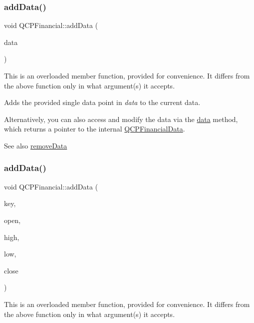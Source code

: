 \subsubsection{\texorpdfstring{add\+Data()}{addData()}\hspace{0.1cm}{\footnotesize\ttfamily [2/4]}}
{\footnotesize\ttfamily void Q\+C\+P\+Financial\+::add\+Data (\begin{DoxyParamCaption}\item[{const \hyperlink{class_q_c_p_financial_data}{Q\+C\+P\+Financial\+Data} \&}]{data }\end{DoxyParamCaption})}

This is an overloaded member function, provided for convenience. It differs from the above function only in what argument(s) it accepts.

Adds the provided single data point in {\itshape data} to the current data.

Alternatively, you can also access and modify the data via the \hyperlink{class_q_c_p_financial_a528c81578e4f25999a9169127763cfd4}{data} method, which returns a pointer to the internal \hyperlink{class_q_c_p_financial_data}{Q\+C\+P\+Financial\+Data}.

\begin{DoxySeeAlso}{See also}
\hyperlink{class_q_c_p_financial_a048c741d3c8cc5709c2c44b759fdf27c}{remove\+Data} 
\end{DoxySeeAlso}
\hypertarget{class_q_c_p_financial_a688bbd052e00a02954ddb0068b378170}{}\label{class_q_c_p_financial_a688bbd052e00a02954ddb0068b378170} 
\subsubsection{\texorpdfstring{add\+Data()}{addData()}\hspace{0.1cm}{\footnotesize\ttfamily [3/4]}}
{\footnotesize\ttfamily void Q\+C\+P\+Financial\+::add\+Data (\begin{DoxyParamCaption}\item[{double}]{key,  }\item[{double}]{open,  }\item[{double}]{high,  }\item[{double}]{low,  }\item[{double}]{close }\end{DoxyParamCaption})}

This is an overloaded member function, provided for convenience. It differs from the above function only in what argument(s) it accepts.

